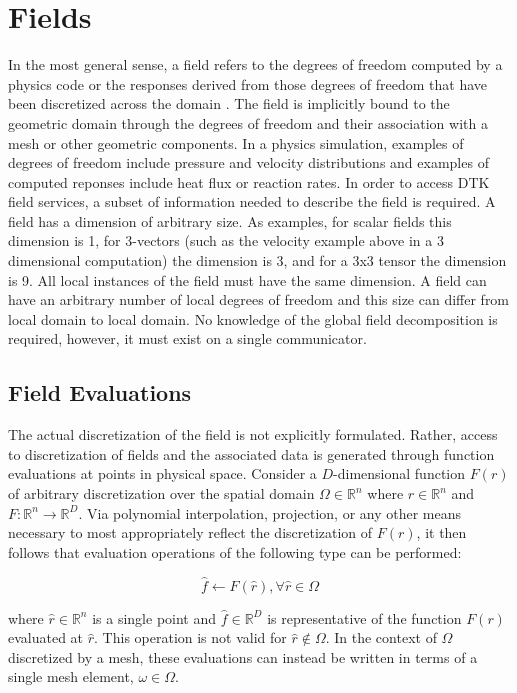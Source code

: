 \documentclass[letterpaper,12pt]{article}
\begin{document}
\section{Fields}\label{sec:field}
In the most general sense, a field refers to the degrees of freedom
computed by a physics code or the responses derived from those degrees
of freedom that have been discretized across the domain
\cite{LIME_2011}. The field is implicitly bound to the geometric
domain through the degrees of freedom and their association with a
mesh or other geometric components. In a physics simulation, examples
of degrees of freedom include pressure and velocity distributions and
examples of computed reponses include heat flux or reaction rates. In
order to access DTK field services, a subset of information needed to
describe the field is required. A field has a dimension of arbitrary
size. As examples, for scalar fields this dimension is 1, for
3-vectors (such as the velocity example above in a 3 dimensional
computation) the dimension is 3, and for a 3x3 tensor the dimension is
9.  All local instances of the field must have the same dimension. A
field can have an arbitrary number of local degrees of freedom and
this size can differ from local domain to local domain. No knowledge
of the global field decomposition is required, however, it must exist
on a single communicator.


\subsection{Field Evaluations}\label{subsec:field_eval}
The actual discretization of the field is not explicitly
formulated. Rather, access to discretization of fields and the
associated data is generated through function evaluations at points in
physical space. Consider a $D$-dimensional function $F(r)$ of
arbitrary discretization over the spatial domain $\Omega \in
\mathbb{R}^n$ where $r \in \mathbb{R}^n$ and $F : \mathbb{R}^n
\rightarrow \mathbb{R}^D$. Via polynomial interpolation, projection,
or any other means necessary to most appropriately reflect the
discretization of $F(r)$, it then follows that evaluation operations
of the following type can be performed:

\begin{equation}
  \hat{f} \leftarrow F(\hat{r}), \forall \hat{r} \in \Omega
  \label{eq:evaluation}
\end{equation}

where $\hat{r} \in \mathbb{R}^n$ is a single point and $\hat{f} \in
\mathbb{R}^D$ is representative of the function $F(r)$ evaluated at
$\hat{r}$. This operation is not valid for $\hat{r} \notin \Omega$. In
the context of $\Omega$ discretized by a mesh, these evaluations can
instead be written in terms of a single mesh element, $\omega \in
\Omega$.
\end{document}

